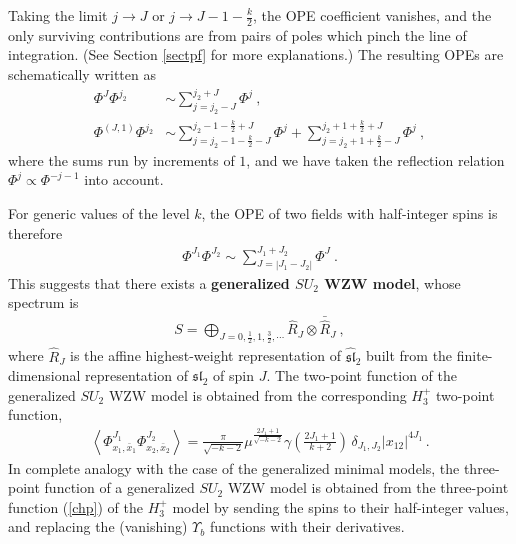 \documentclass[12pt,a4paper,notitlepage]{report}
\newcommand \la {\left\langle}
\newcommand \ra {\right\rangle}
\numberwithin{equation}{section}
\theoremstyle{break}
\begin{document}
Taking the limit $j\rightarrow J$ or $j\rightarrow J-1-\frac{k}{2}$, the OPE coefficient vanishes, and the only surviving contributions are from pairs of poles which pinch the line of integration. (See Section \ref{sectpf} for more explanations.) The resulting OPEs are schematically written as 
\begin{align}
 \Phi^J \Phi^{j_2} & \sim \sum_{j=j_2-J}^{j_2+J} \Phi^j \ ,
\label{pjp}
\\
\Phi^{(J,1)}\Phi^{j_2} & \sim \sum_{j=j_2-1-\frac{k}{2}-J}^{j_2-1-\frac{k}{2}+J} \Phi^j + \sum_{j=j_2+1+\frac{k}{2}-J}^{j_2+1+\frac{k}{2}+J} \Phi^j\ ,
\label{pjop}
\end{align}
where the sums run by increments of $1$, and we have taken the reflection relation $\Phi^j\propto \Phi^{-j-1}$ into account. 

For generic values of the level $k$, the OPE of two fields with half-integer spins is therefore 
\begin{align}
 \boxed{\Phi^{J_1}\Phi^{J_2} \sim \sum_{J=|J_1-J_2|}^{J_1+J_2} \Phi^J}\ .
\end{align}
This suggests that there exists a \textbf{\boldmath generalized $SU_2$ WZW model}, whose spectrum is 
\begin{align}
 \boxed{S = \bigoplus_{J=0,\frac12,1,\frac32,\cdots} \hat{R}_J \otimes \bar{\hat{R}}_J}\ ,
\end{align}
where $\hat{R}_J$ is the affine highest-weight representation of $\widehat{\mathfrak{sl}}_2$ built from the finite-dimensional representation of $\mathfrak{sl}_2$ of spin $J$. The two-point function of the generalized $SU_2$ WZW model is obtained from the corresponding $H_3^+$ two-point function, 
\begin{align}
 \la \Phi^{J_1}_{x_1,\bar{x}_1} \Phi^{J_2}_{x_2,\bar{x}_2} \ra = \frac{\pi}{\sqrt{-k-2}}\mu^{\frac{2J_1+1}{\sqrt{-k-2}}} \gamma(\tfrac{2J_1+1}{k+2})\, \delta_{J_1,J_2}|x_{12}|^{4J_1}\, .
\label{pjpjd}
\end{align}
In complete analogy with the case of the generalized minimal models, the three-point function of a generalized $SU_2$ WZW model is obtained from the three-point function (\ref{chp}) of the $H_3^+$ model by sending the spins to their half-integer values, and replacing the (vanishing) $\Upsilon_b$ functions with their derivatives. 
\end{document}
